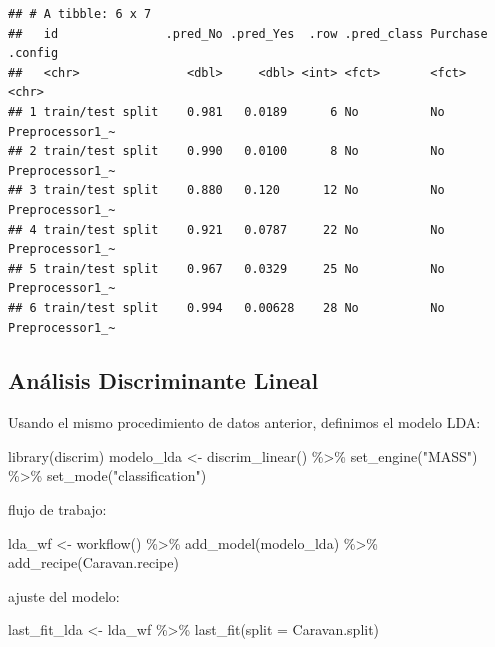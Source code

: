 \documentclass[
  12pt,
]{book}
\newenvironment{Shaded}{\begin{snugshade}}{\end{snugshade}}
\newcommand{\AttributeTok}[1]{\textcolor[rgb]{0.77,0.63,0.00}{#1}}
\newcommand{\FunctionTok}[1]{\textcolor[rgb]{0.00,0.00,0.00}{#1}}
\newcommand{\NormalTok}[1]{#1}
\newcommand{\OtherTok}[1]{\textcolor[rgb]{0.56,0.35,0.01}{#1}}
\newcommand{\SpecialCharTok}[1]{\textcolor[rgb]{0.00,0.00,0.00}{#1}}
\newcommand{\StringTok}[1]{\textcolor[rgb]{0.31,0.60,0.02}{#1}}
\theoremstyle{definition}
\theoremstyle{definition}
\theoremstyle{definition}
\theoremstyle{definition}
\theoremstyle{remark}
\begin{document}
\begin{verbatim}
## # A tibble: 6 x 7
##   id               .pred_No .pred_Yes  .row .pred_class Purchase .config        
##   <chr>               <dbl>     <dbl> <int> <fct>       <fct>    <chr>          
## 1 train/test split    0.981   0.0189      6 No          No       Preprocessor1_~
## 2 train/test split    0.990   0.0100      8 No          No       Preprocessor1_~
## 3 train/test split    0.880   0.120      12 No          No       Preprocessor1_~
## 4 train/test split    0.921   0.0787     22 No          No       Preprocessor1_~
## 5 train/test split    0.967   0.0329     25 No          No       Preprocessor1_~
## 6 train/test split    0.994   0.00628    28 No          No       Preprocessor1_~
\end{verbatim}

\hypertarget{anuxe1lisis-discriminante-lineal-1}{%
\subsection{Análisis Discriminante Lineal}\label{anuxe1lisis-discriminante-lineal-1}}

Usando el mismo procedimiento de datos anterior, definimos el modelo LDA:

\begin{Shaded}
\begin{Highlighting}[]
\FunctionTok{library}\NormalTok{(discrim)}
\NormalTok{modelo\_lda }\OtherTok{\textless{}{-}} \FunctionTok{discrim\_linear}\NormalTok{() }\SpecialCharTok{\%\textgreater{}\%}
    \FunctionTok{set\_engine}\NormalTok{(}\StringTok{"MASS"}\NormalTok{) }\SpecialCharTok{\%\textgreater{}\%}
    \FunctionTok{set\_mode}\NormalTok{(}\StringTok{"classification"}\NormalTok{)}
\end{Highlighting}
\end{Shaded}

flujo de trabajo:

\begin{Shaded}
\begin{Highlighting}[]
\NormalTok{lda\_wf }\OtherTok{\textless{}{-}} \FunctionTok{workflow}\NormalTok{() }\SpecialCharTok{\%\textgreater{}\%}
    \FunctionTok{add\_model}\NormalTok{(modelo\_lda) }\SpecialCharTok{\%\textgreater{}\%}
    \FunctionTok{add\_recipe}\NormalTok{(Caravan.recipe)}
\end{Highlighting}
\end{Shaded}

ajuste del modelo:

\begin{Shaded}
\begin{Highlighting}[]
\NormalTok{last\_fit\_lda }\OtherTok{\textless{}{-}}\NormalTok{ lda\_wf }\SpecialCharTok{\%\textgreater{}\%}
    \FunctionTok{last\_fit}\NormalTok{(}\AttributeTok{split =}\NormalTok{ Caravan.split)}
\end{Highlighting}
\end{Shaded}
\end{document}
